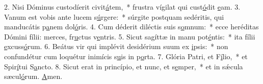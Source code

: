 2. Nisi Dóminus custodíerit civit\uline{á}tem,~* frustra vígilat qui cust\uline{ó}dit \uline{e}am.
3. Vanum est vobis ante lucem s\uline{ú}rgere:~* súrgite postquam sedéritis, qui manducátis p\uline{a}nem dol\uline{ó}ris.
4. Cum déderit diléctis suis s\uline{o}mnum:~* ecce heréditas Dómini fílii: merces, fr\uline{u}ctus v\uline{e}ntris.
5. Sicut sagíttæ in manu pot\uline{é}ntis:~* ita fílii \uline{e}xcuss\uline{ó}rum.
6. Beátus vir qui implévit desidérium suum ex \uline{i}psis:~* non confundétur cum loquétur inimícis s\uline{u}is in p\uline{o}rta.
7. Glória Patri, et F\uline{í}lio,~* et Spir\uline{í}tui S\uline{a}ncto.
8. Sicut erat in princípio, et nunc, et s\uline{e}mper,~* et in sǽcula sæcul\uline{ó}rum. \uline{A}men.
